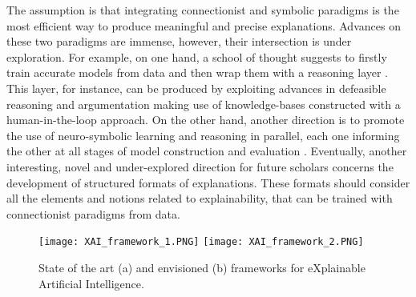 \documentclass[final,1p,times]{elsarticle}
\begin{document}
The assumption is that integrating connectionist and symbolic paradigms is the most efficient way to produce meaningful and precise explanations. 
Advances on these two paradigms are immense, however, their intersection is under exploration. For example, on one hand, a school of thought suggests to firstly train accurate models from data and then wrap them with a reasoning layer \cite{bride2018towards}.
This layer, for instance, can be produced by exploiting advances in defeasible reasoning and argumentation \cite{rizzo2018qualitative,rizzo2019inferential,zeng2018building} making use of knowledge-bases constructed with a human-in-the-loop approach.
On the other hand, another direction is to promote the use of neuro-symbolic learning and reasoning in parallel, each one informing the other at all stages of model construction and evaluation \cite{garcez2015neural}. 
Eventually, another interesting, novel and under-explored direction for future scholars concerns the development of structured formats of explanations. These formats should consider all the elements and notions related to explainability, that can be trained with connectionist paradigms from data. \\

\begin{figure}[!ht]
\begin{minipage}{\textwidth}
\centering
  \subcaptionbox{}
    {\texttt{[image: XAI\_framework\_1.PNG]}}
  \subcaptionbox{}
    {\texttt{[image: XAI\_framework\_2.PNG]}}
  \caption{State of the art (a) and envisioned (b) frameworks for eXplainable Artificial Intelligence.}
  \label{fig:xai_frameworks}
\end{minipage}
\end{figure}
\end{document}

